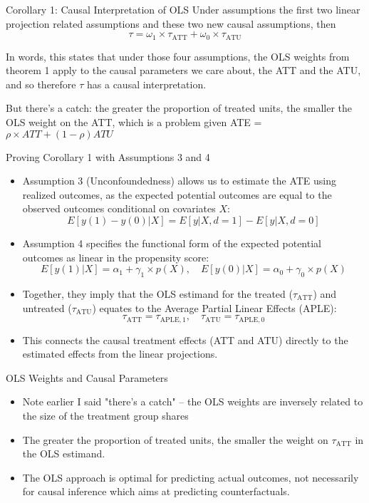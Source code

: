 \documentclass{beamer}
\begin{document}
\begin{frame}{Corollary 1: Causal Interpretation of OLS}
  Under assumptions the first two linear projection related assumptions and these two new causal assumptions, then
  \[
    \tau = \omega_1 \times \tau_{\text{ATT}} + \omega_0 \times \tau_{\text{ATU}}
  \]
  
  In words, this states that under those four assumptions, the OLS weights from theorem 1 apply to the causal parameters we care about, the ATT and the ATU, and so therefore $\tau$ has a causal interpretation.  
  
  \bigskip
  
  But there's a catch: the greater the proportion of treated units, the smaller the OLS weight on the ATT, which is a problem given ATE = $\rho \times ATT + (1-\rho) ATU$
\end{frame}

\begin{frame}{Proving Corollary 1 with Assumptions 3 and 4}
  \begin{itemize}
    \item Assumption 3 (Unconfoundedness) allows us to estimate the ATE using realized outcomes, as the expected potential outcomes are equal to the observed outcomes conditional on covariates \( X \):
    \[ E[y(1) - y(0) | X] = E[y | X, d = 1] - E[y | X, d = 0] \]
    \item Assumption 4 specifies the functional form of the expected potential outcomes as linear in the propensity score:
    \[ E[y(1) | X] = \alpha_1 + \gamma_1 \times p(X), \quad E[y(0) | X] = \alpha_0 + \gamma_0 \times p(X) \]
    \item Together, they imply that the OLS estimand for the treated (\( \tau_{\text{ATT}} \)) and untreated (\( \tau_{\text{ATU}} \)) equates to the Average Partial Linear Effects (APLE):
    \[ \tau_{\text{ATT}} = \tau_{\text{APLE},1}, \quad \tau_{\text{ATU}} = \tau_{\text{APLE},0} \]
    \item This connects the causal treatment effects (ATT and ATU) directly to the estimated effects from the linear projections.
  \end{itemize}
\end{frame}


\begin{frame}{OLS Weights and Causal Parameters}
  \begin{itemize}
  \item Note earlier I said "there's a catch" -- the OLS weights are inversely related to the size of the treatment group shares
    \item The greater the proportion of treated units, the smaller the weight on \( \tau_{\text{ATT}} \) in the OLS estimand.
    \item The OLS approach is optimal for predicting actual outcomes, not necessarily for causal inference which aims at predicting counterfactuals.
  \end{itemize}
\end{frame}
\end{document}
